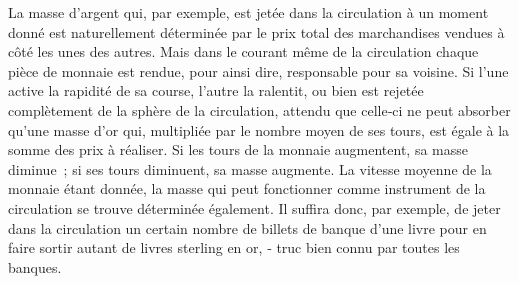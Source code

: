 \documentclass[french,twoside]{book} %
\begin{document}
La masse d’argent qui, par exemple, est jetée dans la circulation à un moment donné est naturellement déterminée par le prix total des marchandises vendues à côté les unes des autres. Mais dans le courant même de la circulation chaque pièce de monnaie est rendue, pour ainsi dire, responsable pour sa voisine. Si l’une active la rapidité de sa course, l’autre la ralentit, ou bien est rejetée complètement de la sphère de la circulation, attendu que celle‑ci ne peut absorber qu’une masse d’or qui, multipliée par le nombre moyen de ses tours, est égale à la somme des prix à réaliser. Si les tours de la monnaie augmentent, sa masse diminue ; si ses tours diminuent, sa masse augmente. La vitesse moyenne de la monnaie étant donnée, la masse qui peut fonctionner comme instrument de la circulation se trouve déterminée également. Il suffira donc, par exemple, de jeter dans la circulation un certain nombre de billets de banque d’une livre pour en faire sortir autant de livres sterling en or, ‑ truc bien connu par toutes les banques.\par
\end{document}

